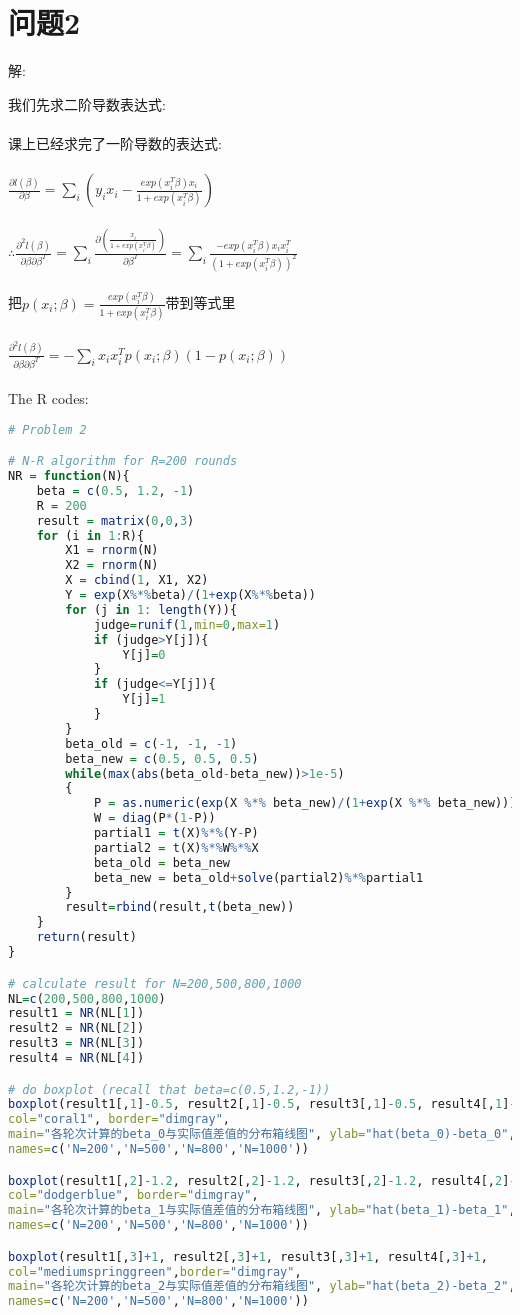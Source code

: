 \documentclass[]{article}
\begin{document}
\section{问题2}
\begin{flushleft}
	解:
\end{flushleft}
我们先求二阶导数表达式:\\\\
课上已经求完了一阶导数的表达式:\\\\
$\frac{\partial l(\beta)}{\partial\beta}=\sum_{i}(y_ix_i-\frac{exp(x_i^T\beta)x_i}{1+exp(x_i^T\beta)})$\\\\
$\therefore \frac{\partial^2l(\beta)}{\partial\beta\partial\beta^T}=\sum_{i}\frac{\partial(\frac{x_i}{1+exp(x_i^T\beta)})}{\partial\beta^T}=\sum_i\frac{-exp(x_i^T\beta)x_ix_i^T}{(1+exp(x_i^T\beta))^2}$\\\\
把$p(x_i;\beta)=\frac{exp(x_i^T\beta)}{1+exp(x_i^T\beta)}$带到等式里\\\\
 $\frac{\partial^2l(\beta)}{\partial\beta\partial\beta^T}=-\sum_ix_ix_i^Tp(x_i;\beta)(1-p(x_i;\beta))$\\\\
The R codes:
\begin{lstlisting}[language=R]
# Problem 2 

# N-R algorithm for R=200 rounds
NR = function(N){
	beta = c(0.5, 1.2, -1)
	R = 200
	result = matrix(0,0,3)
	for (i in 1:R){
		X1 = rnorm(N)
		X2 = rnorm(N)
		X = cbind(1, X1, X2)  
		Y = exp(X%*%beta)/(1+exp(X%*%beta))
		for (j in 1: length(Y)){
			judge=runif(1,min=0,max=1)
			if (judge>Y[j]){
				Y[j]=0
			}
			if (judge<=Y[j]){
				Y[j]=1
			}
		}
		beta_old = c(-1, -1, -1) 
		beta_new = c(0.5, 0.5, 0.5)
		while(max(abs(beta_old-beta_new))>1e-5)
		{
			P = as.numeric(exp(X %*% beta_new)/(1+exp(X %*% beta_new)))  
			W = diag(P*(1-P))
			partial1 = t(X)%*%(Y-P)
			partial2 = t(X)%*%W%*%X
			beta_old = beta_new
			beta_new = beta_old+solve(partial2)%*%partial1
		}
		result=rbind(result,t(beta_new)) 
	}
	return(result)  
}

# calculate result for N=200,500,800,1000
NL=c(200,500,800,1000)
result1 = NR(NL[1]) 
result2 = NR(NL[2]) 
result3 = NR(NL[3]) 
result4 = NR(NL[4])

# do boxplot (recall that beta=c(0.5,1.2,-1))
boxplot(result1[,1]-0.5, result2[,1]-0.5, result3[,1]-0.5, result4[,1]-0.5, 
col="coral1", border="dimgray",
main="各轮次计算的beta_0与实际值差值的分布箱线图", ylab="hat(beta_0)-beta_0", 
names=c('N=200','N=500','N=800','N=1000'))

boxplot(result1[,2]-1.2, result2[,2]-1.2, result3[,2]-1.2, result4[,2]-1.2, 
col="dodgerblue", border="dimgray",
main="各轮次计算的beta_1与实际值差值的分布箱线图", ylab="hat(beta_1)-beta_1", 
names=c('N=200','N=500','N=800','N=1000'))

boxplot(result1[,3]+1, result2[,3]+1, result3[,3]+1, result4[,3]+1, 
col="mediumspringgreen",border="dimgray",
main="各轮次计算的beta_2与实际值差值的分布箱线图", ylab="hat(beta_2)-beta_2", 
names=c('N=200','N=500','N=800','N=1000'))

\end{lstlisting}
\end{document}
